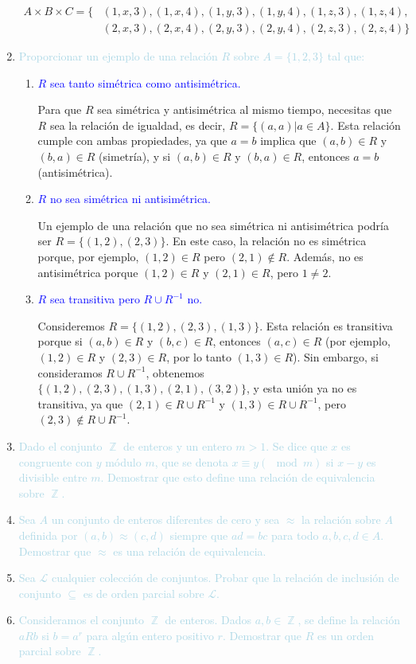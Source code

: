 \documentclass[12pt]{article}
\newcommand{\lb}[1]{\textcolor{lightblue}{#1}}
\newcommand{\db}[1]{\textcolor{blue}{#1}}
\DeclareMathOperator{\Z}{\mathbb{Z}}
\begin{document}
\begin{enumerate}[label=\color{red}\textbf{\arabic*)},leftmargin=*]
      \[\begin{aligned}
      	A\times B\times C=\{&(1,x,3),(1,x,4),(1,y,3),(1,y,4),(1,z,3),(1,z,4),\\
      	&(2,x,3),(2,x,4),(2,y,3),(2,y,4),(2,z,3),(2,z,4)\}
      \end{aligned}\]
      \item \lb{Proporcionar un ejemplo de una relación $R$ sobre $A=\{1,2,3\}$ tal que:}
      \begin{enumerate}[label=\color{red}\alph*)]
      	\item \db{$R$ sea tanto simétrica como antisimétrica.}
      	
      	Para que $R$ sea simétrica y antisimétrica al mismo tiempo, necesitas que $R$ sea la relación de igualdad, es decir, $R=\{(a,a)|a\in A\}$. Esta relación cumple con ambas propiedades, ya que $a=b$ implica que $(a,b)\in R$ y $(b,a)\in R$ (simetría), y si $(a,b)\in R$ y $(b,a)\in R$, entonces $a=b$ (antisimétrica).
      	\item \db{$R$ no sea simétrica ni antisimétrica.}
      	
      	Un ejemplo de una relación que no sea simétrica ni antisimétrica podría ser $R=\{(1,2),(2,3)\}$. En este caso, la relación no es simétrica porque, por ejemplo, $(1,2)\in R$ pero $(2,1)\notin R$. Además, no es antisimétrica porque $(1,2)\in R$ y $(2,1)\in R$, pero $1\neq2$.
      	\item \db{$R$ sea transitiva pero $R\cup R^{-1}$ no.}
      	
      	Consideremos $R=\{(1,2),(2,3),(1,3)\}$. Esta relación es transitiva porque si $(a,b)\in R$ y $(b,c)\in R$, entonces $(a,c)\in R$ (por ejemplo, $(1,2)\in R$ y $(2,3)\in R$, por lo tanto $(1,3)\in R$). Sin embargo, si consideramos $R\cup R^{-1}$, obtenemos $\{(1,2),(2,3),(1,3),(2,1),(3,2)\}$, y esta unión ya no es transitiva, ya que $(2,1)\in R\cup R^{-1}$ y $(1,3)\in R\cup R^{-1}$, pero $(2,3)\notin R\cup R^{-1}$.
      \end{enumerate}
      \item \lb{Dado el conjunto $\Z$ de enteros y un entero $m>1$. Se dice que $x$ es congruente con $y$ módulo $m$, que se denota $x\equiv y(\mod m)$ si $x-y$ es divisible entre $m$. Demostrar que esto define una relación de equivalencia sobre $\Z$.}
      \item \lb{Sea $A$ un conjunto de enteros diferentes de cero y sea $\approx$ la relación sobre $A$ definida por $(a,b)\approx(c,d)$ siempre que $ad=bc$ para todo $a,b,c,d\in A$. Demostrar que $\approx$ es una relación de equivalencia.}
      \item \lb{Sea $\mathcal{L}$ cualquier colección de conjuntos. Probar que la relación de inclusión de conjunto $\subseteq$ es de orden parcial sobre $\mathcal{L}$.}
      \item \lb{Consideramos el conjunto $\Z$ de enteros. Dados $a,b\in\Z$, se define la relación $aRb$ si $b=a^r$ para algún entero positivo $r$. Demostrar que $R$ es un orden parcial sobre $\Z$.}
\end{enumerate}
\newpage
\end{document}
